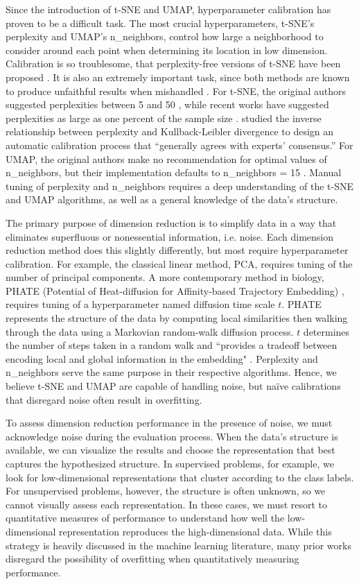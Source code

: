 \documentclass{article}
\begin{document}
Since the introduction of t-SNE and UMAP, hyperparameter calibration has proven to be a difficult task. The most crucial hyperparameters, t-SNE's perplexity and UMAP's n\_neighbors, control how large a neighborhood to consider around each point when determining its location in low dimension. Calibration is so troublesome, that perplexity-free versions of t-SNE have been proposed \cite{perplexity-free t-SNE}. It is also an extremely important task, since both methods are known to produce unfaithful results when mishandled \cite{evaluation of DR transcriptomics}. For t-SNE, the original authors suggested perplexities between 5 and 50 \cite{t-SNE}, while recent works have suggested perplexities as large as one percent of the sample size \cite{t-SNE cell}. \cite{perplexity vs kl} studied the inverse relationship between perplexity and Kullback-Leibler divergence to design an automatic calibration process that ``generally agrees with experts' consensus.'' For UMAP, the original authors make no recommendation for optimal values of n\_neighbors, but their implementation defaults to n\_neighbors = 15 \cite{umap}. Manual tuning of perplexity and n\_neighbors requires a deep understanding of the t-SNE and UMAP algorithms, as well as a general knowledge of the data's structure.

The primary purpose of dimension reduction is to simplify data in a way that eliminates superfluous or nonessential information, i.e. noise. Each dimension reduction method does this slightly differently, but most require hyperparameter calibration. For example, the classical linear method, PCA, requires tuning of the number of principal components. A more contemporary method in biology, PHATE (Potential of Heat-diffusion for Affinity-based Trajectory Embedding) \cite{PHATE}, requires tuning of a hyperparameter named diffusion time scale $t$. PHATE represents the structure of the data by computing local similarities then walking through the data using a Markovian random-walk diffusion process. $t$ determines the number of steps taken in a random walk and ``provides a tradeoff between encoding local and global information in the embedding" \cite{PHATE}. Perplexity and n\_neighbors serve the same purpose in their respective algorithms. Hence, we believe t-SNE and UMAP are capable of handling noise, but na\"ive calibrations that disregard noise often result in overfitting.

To assess dimension reduction performance in the presence of noise, we must acknowledge noise during the evaluation process. When the data's structure is available, we can visualize the results and choose the representation that best captures the hypothesized structure. In supervised problems, for example, we look for low-dimensional representations that cluster according to the class labels. For unsupervised problems, however, the structure is often unknown, so we cannot visually assess each representation. In these cases, we must resort to quantitative measures of performance to understand how well the low-dimensional representation reproduces the high-dimensional data. While this strategy is heavily discussed in the machine learning literature, many prior works disregard the possibility of overfitting when quantitatively measuring performance.
\end{document}
